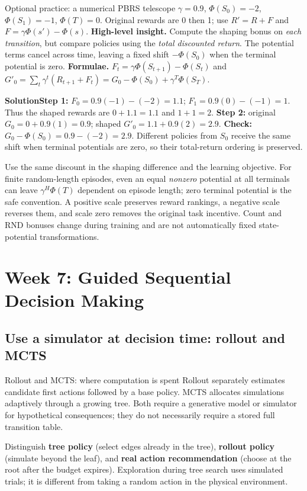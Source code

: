 \documentclass[10pt,a4paper]{article}
\newcommand{\ans}{\par\smallskip\textbf{\color{good}Solution\quad}}
\newcommand{\topic}[1]{\clearpage\section{#1}}
\begin{document}
\begin{question}{Optional practice: a numerical PBRS telescope}
$\gamma=0.9$, $\Phi(S_0)=-2$, $\Phi(S_1)=-1$, $\Phi(T)=0$. Original rewards are 0 then 1; use $R'=R+F$ and $F=\gamma\Phi(s')-\Phi(s)$.
\textbf{High-level insight.} Compute the shaping bonus on \emph{each transition}, but compare policies using the \emph{total discounted return}. The potential terms cancel across time, leaving a fixed shift $-\Phi(S_0)$ when the terminal potential is zero.
\textbf{Formulae.} $F_t=\gamma\Phi(S_{t+1})-\Phi(S_t)$ and $G'_0=\sum_t\gamma^t(R_{t+1}+F_t)=G_0-\Phi(S_0)+\gamma^T\Phi(S_T)$.
\ans \textbf{Step 1:} $F_0=0.9(-1)-(-2)=1.1$; $F_1=0.9(0)-(-1)=1$. Thus the shaped rewards are $0+1.1=1.1$ and $1+1=2$.
\textbf{Step 2:} original $G_0=0+0.9(1)=0.9$; shaped $G'_0=1.1+0.9(2)=2.9$.
\textbf{Check:} $G_0-\Phi(S_0)=0.9-(-2)=2.9$. Different policies from $S_0$ receive the same shift when terminal potentials are zero, so their total-return ordering is preserved.
\end{question}
\begin{note}
Use the same discount in the shaping difference and the learning objective. For finite random-length episodes, even an equal \emph{nonzero} potential at all terminals can leave $\gamma^H\Phi(T)$ dependent on episode length; zero terminal potential is the safe convention. A positive scale preserves reward rankings, a negative scale reverses them, and scale zero removes the original task incentive. Count and RND bonuses change during training and are not automatically fixed state-potential transformations.
\end{note}
\topic{Week 7: Guided Sequential Decision Making}



\subsection{Use a simulator at decision time: rollout and MCTS}
\begin{card}{Rollout and MCTS: where computation is spent}
Rollout separately estimates candidate first actions followed by a base policy. MCTS allocates simulations adaptively through a growing tree. Both require a generative model or simulator for hypothetical consequences; they do not necessarily require a stored full transition table.

Distinguish \textbf{tree policy} (select edges already in the tree), \textbf{rollout policy} (simulate beyond the leaf), and \textbf{real action recommendation} (choose at the root after the budget expires). Exploration during tree search uses simulated trials; it is different from taking a random action in the physical environment.
\end{card}
\end{document}
